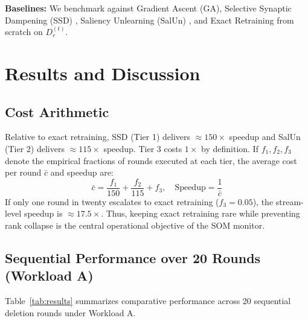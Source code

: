 \documentclass[conference]{IEEEtran}
\begin{document}
\textbf{Baselines:} We benchmark against Gradient Ascent (GA), Selective Synaptic Dampening (SSD) \cite{b4}, Saliency Unlearning (SalUn) \cite{b5}, and Exact Retraining from scratch on $D_r^{(t)}$.

\section{Results and Discussion}

\subsection{Cost Arithmetic}
Relative to exact retraining, SSD (Tier 1) delivers $\approx 150\times$ speedup and SalUn (Tier 2) delivers $\approx 115\times$ speedup. Tier 3 costs $1\times$ by definition. If $f_1, f_2, f_3$ denote the empirical fractions of rounds executed at each tier, the average cost per round $\bar{c}$ and speedup are:
\begin{equation}
\bar{c} = \frac{f_1}{150} + \frac{f_2}{115} + f_3, \quad \text{Speedup} = \frac{1}{\bar{c}} \label{eq:cost}
\end{equation}
If only one round in twenty escalates to exact retraining ($f_3 = 0.05$), the stream-level speedup is $\approx 17.5\times$. Thus, keeping exact retraining rare while preventing rank collapse is the central operational objective of the SOM monitor.

\subsection{Sequential Performance over 20 Rounds (Workload A)}
Table~\ref{tab:results} summarizes comparative performance across 20 sequential deletion rounds under Workload A.

\begin{table}[t]
\caption{Sequential Machine Unlearning Benchmark Matrix on CIFAR-10 ResNet-18 (Workload A, 20 Rounds, 10,000 Deleted Samples)}
\label{tab:results}
\centering
{}
\end{table}
\end{document}

